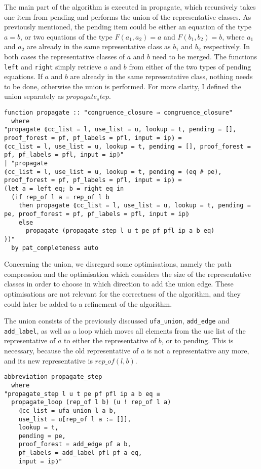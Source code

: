 The main part of the algorithm is executed in propagate, which recursively takes one item from pending and performs the union of the representative classes. As previously mentioned, the pending item could be either an equation of the type $a = b$, or two equations of the type $F(a_1, a_2) = a$ and $F(b_1, b_2) = b$, where $a_1$ and $a_2$ are already in the same representative class as $b_1$ and $b_2$ respectively. In both cases the representative classes of $a$ and $b$ need to be merged. The functions \lstinline{left} and \lstinline{right} simply retrieve $a$ and $b$ from either of the two types of pending equations. If $a$ and $b$ are already in the same representative class, nothing needs to be done, otherwise the union is performed. For more clarity, I defined the union separately as $propagate_step$.

\begin{lstlisting}
function propagate :: "congruence_closure ⇒ congruence_closure"
  where
"propagate ⦇cc_list = l, use_list = u, lookup = t, pending = [], proof_forest = pf, pf_labels = pfl, input = ip⦈ =
⦇cc_list = l, use_list = u, lookup = t, pending = [], proof_forest = pf, pf_labels = pfl, input = ip⦈"
| "propagate
⦇cc_list = l, use_list = u, lookup = t, pending = (eq # pe), proof_forest = pf, pf_labels = pfl, input = ip⦈ =
(let a = left eq; b = right eq in
  (if rep_of l a = rep_of l b
    then propagate ⦇cc_list = l, use_list = u, lookup = t, pending = pe, proof_forest = pf, pf_labels = pfl, input = ip⦈
    else
      propagate (propagate_step l u t pe pf pfl ip a b eq)
))"
  by pat_completeness auto
\end{lstlisting}

Concerning the union, we disregard some optimisations, namely the path compression and the optimisation which considers the size of the representative classes in order to choose in which direction to add the union edge. These optimisations are not relevant for the correctness of the algorithm, and they could later be added to a refinement of the algorithm.

The union consists of the previously discussed \lstinline{ufa_union}, \lstinline{add_edge} and \lstinline{add_label}, as well as a loop which moves all elements from the use list of the representative of $a$ to either the representative of $b$, or to pending. This is necessary, because the old representative of $a$ is not a representative any more, and its new representative is  $rep\_of(l, b)$.

\begin{lstlisting}
abbreviation propagate_step
  where
"propagate_step l u t pe pf pfl ip a b eq ≡
  propagate_loop (rep_of l b) (u ! rep_of l a)
    ⦇cc_list = ufa_union l a b,
    use_list = u[rep_of l a := []],
    lookup = t,
    pending = pe,
    proof_forest = add_edge pf a b,
    pf_labels = add_label pfl pf a eq,
    input = ip⦈"
\end{lstlisting}

